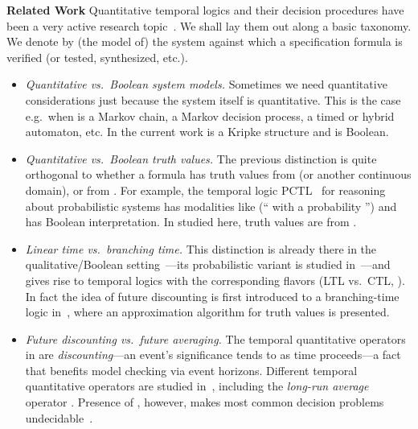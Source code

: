\documentclass[a4paper,USenglish,numberwithinsect]{lipics}
\theoremstyle{definition}
\theoremstyle{remark}
\theoremstyle{plain}
\begin{document}
\noindent
\textbf{Related Work}\quad
Quantitative  temporal logics and their decision procedures
have  been a very active research
topic~\cite{AlmagorBK14,AlmagorBK13,AlfaroHM03,BouyerMM14,FaellaLS08}. 
 We shall lay them out along a basic taxonomy. We denote by   (the model of) the
system against which a specification formula  is verified (or tested, synthesized,
etc.).


\begin{itemize}
\item
  \textit{Quantitative vs.\ Boolean system models.} Sometimes we need
       quantitative considerations just because the system
         itself is quantitative. This is the case e.g.\ when  is a Markov chain, a Markov decision
       process, a timed or hybrid automaton, etc. In the current work
        is a Kripke structure and is Boolean.

\item
 \textit{Quantitative vs.\ Boolean truth values.} The previous
       distinction is quite orthogonal to whether a formula 
       has truth values from  (or another continuous domain), or from
       . For example, the temporal logic PCTL~\cite{HanssonJ94} for
       reasoning about probabilistic systems has modalities
       like  (`` with a probability 
       '') and has Boolean interpretation.  In  studied  here,
       truth values are from .

\item
 \textit{Linear time vs.\ branching time.} This distinction is
       already there in the qualitative/Boolean
       setting~\cite{vanGlabbeek01}---its probabilistic variant is
       studied in~\cite{CheungSV07}---and gives rise to temporal logics
       with the corresponding flavors (LTL vs.\ CTL, ).
       In fact the idea of future discounting is first introduced to 
       a branching-time logic in~\cite{AlfaroHM03}, where an
       approximation algorithm for truth values is presented.



\item
 \textit{Future discounting vs.\ future averaging.} The temporal
       quantitative operators in  are \emph{discounting}---an
     event's significance tends to  as time proceeds---a fact that
       benefits model checking  via event horizons. 
        Different  temporal
       quantitative operators are studied in~\cite{BouyerMM14}, including the
       \emph{long-run average} operator . 
     Presence of , however, makes most
       common decision problems undecidable~\cite{BouyerMM14}.

\end{itemize}
\end{document}
